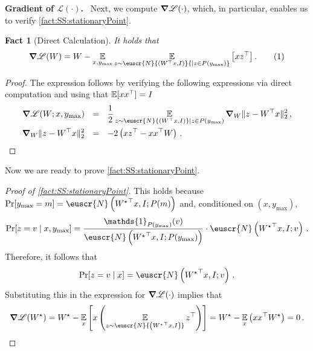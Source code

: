 \documentclass[11pt,letterpaper]{article}
\theoremstyle{plain}
\newtheorem{fact}[theorem]{Fact}
\theoremstyle{definition}
\theoremstyle{remark}
\newcommand{\yesnum}{\addtocounter{equation}{1}\tag{\theequation}}
\newcommand{\inparen}[1]{\ensuremath{\left(#1\right)}}
\newcommand{\insquare}[1]{\ensuremath{\left[#1\right]}}
\newcommand{\snorm}[1]{\ensuremath{\ensuremath{\| #1 \|}}}
\newcommand{\E}{\operatornamewithlimits{\mathbb{E}}}
\newcommand{\Ex}{\E}
\newcommand{\customcal}[1]{\euscr{#1}}
\newcommand{\cL}{\customcal{L}}
\newcommand{\cN}{\customcal{N}}
\renewcommand{\paragraph}[1]{\medskip \noindent\textbf{#1}~}
\newcommand{\negLL}{\ensuremath{\mathscr{L}}}
\newcommand{\normal}[2]{\cN{\inparen{#1,#2}}}
\newcommand{\normalMass}[3]{\cN\inparen{#1, #2; #3}}
\newcommand{\Wstar}{{W^\star}}
\newcommand{\ymax}{y_{\max}}
\renewcommand{\cL}{\negLL}
\begin{document}
{{{        \paragraph{Gradient of $\cL(\cdot)$.}
        Next, we compute $\grad\cL(\cdot)$, which, in particular, enables us to verify \cref{fact:SS:stationaryPoint}.
        \begin{fact}[Direct Calculation]
            It holds that 
            \[
                \grad \cL(W)
                = W - \Ex_{x, \ymax}
                    {
                        \Ex_{z\sim \normal{W^\top x}{I} {\mid z\in P(\ymax)}}\insquare{xz^\top }
                    }
                    \,.
                \yesnum\label{eq:SS:gradientExpression}
            \]
        \end{fact}
        \begin{proof}
            The expression follows by verifying the following expressions via direct computation and using that $\Ex[xx^\top]=I$
            \begin{align*}
                \grad \cL(W; x,\ymax)
                    &~~=~~ \frac{1}{2}\Ex_{z\sim \normal{W^\top x}{I} \mid z\in P(\ymax)}{
                        \grad_W \snorm{z-W^\top x}_2^2
                    }\,,\\
                \grad_W \snorm{z-W^\top x}_2^2 
                    &~~=~~ -2\inparen{xz^\top -xx^\top W}\,.
            \end{align*}
        \end{proof}
        Now we are ready to prove \cref{fact:SS:stationaryPoint}.
        \begin{proof}[Proof of \cref{fact:SS:stationaryPoint}]
            This holds because $\Pr[\ymax = m] = \normalMass{{W^\star}^\top x}{I}{{P(m)}}$ and, conditioned on $(x,\ymax)$, 
            \[
                \Pr[z=v\mid x,\ymax]= \frac{\mathds{1}_{P({\ymax})}(v)}{\normalMass{{W^\star}^\top x}{I}{P({\ymax})}}\cdot \normalMass{{W^\star}^\top x}{I}{v}\,.  
            \]
            Therefore, it follows that 
            \[
                \Pr[z=v\mid x] = \normalMass{{W^\star}^\top x}{I}{v}\,.  
            \]
            Substituting this in the expression for $\grad\cL(\cdot)$ implies that
            \[
                \grad \cL(W^\star) 
                = W^\star - \Ex_x \insquare{x \inparen{\Ex_{z\sim \normal{\Wstar^\top x}{I}} z^\top}}
                = \Wstar - \Ex_{x}\inparen{ xx^\top W^\star} = 0\,.
            \]
        \end{proof}
        
}}}
\end{document}
